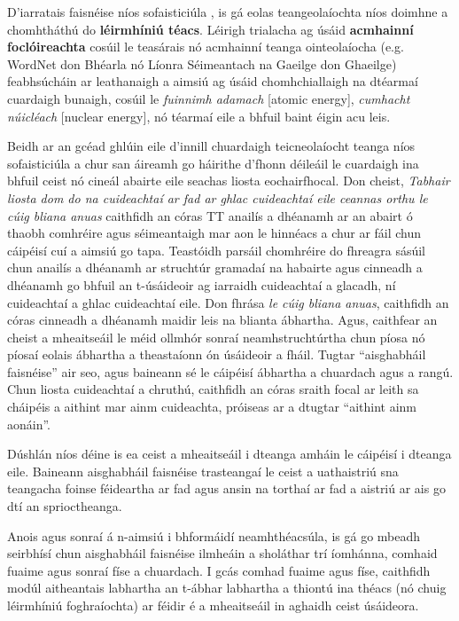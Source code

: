\begin{multicols}{2}
D’iarratais faisnéise níos sofaisticiúla , is gá eolas teangeolaíochta níos doimhne a chomhtháthú do \textbf{léirmhíniú téacs}. Léirigh trialacha ag úsáid \textbf{acmhainní foclóireachta} cosúil le teasárais nó acmhainní teanga ointeolaíocha (e.g. WordNet don Bhéarla nó Líonra Séimeantach na Gaeilge don Ghaeilge) feabhsúcháin ar leathanaigh a aimsiú ag úsáid chomhchiallaigh na dtéarmaí cuardaigh bunaigh, cosúil le \textit{fuinnimh adamach} [atomic energy], \textit{cumhacht núicléach} [nuclear energy], nó téarmaí eile a bhfuil baint éigin acu leis.

Beidh ar an gcéad ghlúin eile d’innill chuardaigh teicneolaíocht teanga níos sofaisticiúla a chur san áireamh go háirithe d’fhonn déileáil le cuardaigh ina bhfuil ceist nó cineál abairte eile seachas liosta eochairfhocal. Don cheist, \textit{Tabhair liosta dom do na cuideachtaí ar fad ar ghlac cuideachtaí eile ceannas orthu le cúig bliana anuas} caithfidh an córas TT anailís a dhéanamh ar an abairt ó thaobh comhréire agus séimeantaigh mar aon le hinnéacs a chur ar fáil chun cáipéisí cuí a aimsiú go tapa. Teastóidh parsáil chomhréire do fhreagra sásúil chun anailís a dhéanamh ar struchtúr gramadaí na habairte agus cinneadh a dhéanamh go bhfuil an t-úsáideoir ag iarraidh cuideachtaí a glacadh, ní cuideachtaí a ghlac cuideachtaí eile. Don fhrása \textit{le cúig bliana anuas}, caithfidh an córas cinneadh a dhéanamh maidir leis na blianta ábhartha. Agus, caithfear an cheist a mheaitseáil le méid ollmhór sonraí neamhstruchtúrtha chun píosa nó píosaí eolais ábhartha a theastaíonn ón úsáideoir a fháil. Tugtar ``aisghabháil faisnéise'' air seo, agus baineann sé le cáipéisí ábhartha a chuardach agus a rangú. Chun liosta cuideachtaí a chruthú, caithfidh an córas sraith focal ar leith sa cháipéis a aithint mar ainm cuideachta, próiseas ar a dtugtar ``aithint ainm aonáin''.


Dúshlán níos déine is ea ceist a mheaitseáil i dteanga amháin le cáipéisí i dteanga eile. Baineann aisghabháil faisnéise trasteangaí  le ceist a uathaistriú sna teangacha foinse féideartha ar fad agus ansin na torthaí ar fad a aistriú ar ais go dtí an sprioctheanga. 

Anois agus sonraí á n-aimsiú i bhformáidí neamhthéacsúla, is gá go mbeadh seirbhísí chun aisghabháil faisnéise ilmheáin a sholáthar trí íomhánna, comhaid fuaime agus sonraí físe a chuardach. I gcás comhad fuaime agus físe, caithfidh modúl aitheantais labhartha an t-ábhar labhartha a thiontú ina théacs (nó chuig léirmhíniú foghraíochta) ar féidir é a mheaitseáil in aghaidh ceist úsáideora.


\end{multicols}
